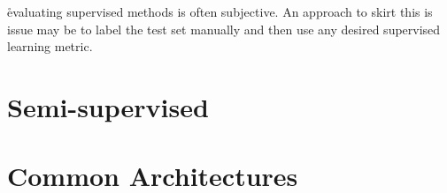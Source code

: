 
\r{evaluating supervised methods is often subjective. An approach to skirt this is issue may be to label the test set manually and then use any desired supervised learning metric.}






%


\chapter{Semi-supervised}




\chapter{Common Architectures}













